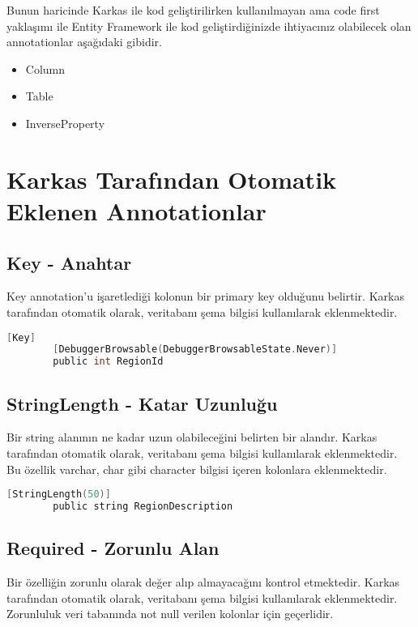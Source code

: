 \documentclass[10pt,a4paper]{article}
\begin{document}
Bunun haricinde Karkas ile kod geliştirilirken kullanılmayan
ama code first yaklaşımı ile Entity Framework ile kod
geliştirdiğinizde ihtiyacınız olabilecek olan
annotationlar aşağıdaki gibidir.


\begin{itemize}

\item  Column

\item Table

\item InverseProperty
\end{itemize}


\section{Karkas Tarafından Otomatik Eklenen Annotationlar}

\subsection{Key - Anahtar}
Key annotation'u işaretlediği kolonun bir primary key olduğunu belirtir.
Karkas tarafından otomatik olarak, veritabanı şema bilgisi kullanılarak eklenmektedir.

\begin{lstlisting}[label=code-Key,caption=Key,language=C]
		[Key]
		[DebuggerBrowsable(DebuggerBrowsableState.Never)]
		public int RegionId
\end{lstlisting}


\subsection{StringLength - Katar Uzunluğu}
Bir string alanının ne kadar uzun olabileceğini belirten bir alandır.
Karkas tarafından otomatik olarak, veritabanı şema bilgisi kullanılarak eklenmektedir.
Bu özellik varchar, char gibi character bilgisi içeren kolonlara eklenmektedir.

\begin{lstlisting}[label=code-StringLength,caption=StringLength,language=C]
		[StringLength(50)]
		public string RegionDescription
\end{lstlisting}



\subsection{Required - Zorunlu Alan}
Bir özelliğin zorunlu olarak değer alıp almayacağını kontrol etmektedir.
Karkas tarafından otomatik olarak, veritabanı şema bilgisi kullanılarak eklenmektedir.
Zorunluluk veri tabanında not null verilen kolonlar için geçerlidir.
\end{document}
